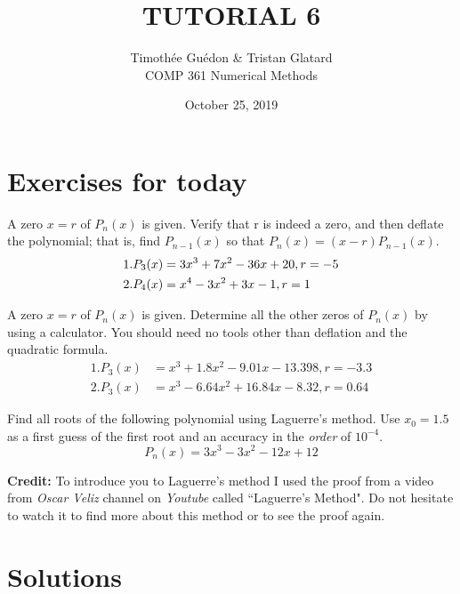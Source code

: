 \documentclass[12pt]{article}
\newenvironment{exercise}[2][Exercise]{\begin{trivlist}
\item[\hskip \labelsep {\bfseries #1}\hskip \labelsep {\bfseries #2.}]}{\end{trivlist}}
\begin{document}
\title{TUTORIAL 6}
\author{Timothée Guédon \& Tristan Glatard\\
COMP 361 Numerical Methods}
\date{October 25, 2019}
\maketitle

\section{Exercises for today}

\begin{exercise}{1}
  A zero $x = r$ of $P_n(x)$ is given. Verify that r is indeed a zero, and then deflate the polynomial; that is, find $P_{n-1}(x)$ so that $P_n(x) = (x-r)P_{n-1}(x)$.
  \begin{align}
    1. P_3(x) &= 3x^3 + 7x^2 - 36x + 20, r = -5 \notag \\
    2. P_4(x) &= x^4 - 3x^2 + 3x - 1, r = 1 \notag
  \end{align}
\end{exercise}

\begin{exercise}{2}
  A zero $x = r$ of $P_n(x)$ is given. Determine all the other zeros of $P_n(x)$ by
  using a calculator. You should need no tools other than deflation and the quadratic
  formula.
  \begin{align}
    1. P_3(x) &= x^3+1.8x^2-9.01x-13.398, r =-3.3\\
    2. P_3(x) &= x^3-6.64x^2+16.84x-8.32, r = 0.64
  \end{align}
\end{exercise}

\begin{exercise}{3}
  Find all roots of the following polynomial using Laguerre's method. Use $x_0=1.5$ as a first guess of the first root and an accuracy in the \textit{order} of $10^{-4}$.
  $$P_n(x) = 3x^3-3x^2-12x+12$$
\end{exercise}

\noindent \textbf{Credit:} To introduce you to Laguerre's method I used the proof from a video from \textit{Oscar Veliz} channel on \textit{Youtube} called ``Laguerre's Method". Do not hesitate to watch it to find more about this method or to see the proof again. 

\break

\section{Solutions}
\end{document}

